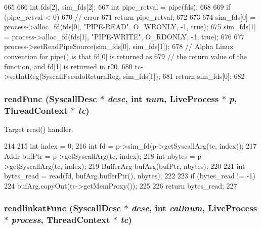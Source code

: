 \begin{DoxyCode}
665 {
666     int fds[2], sim_fds[2];
667     int pipe_retval = pipe(fds);
668 
669     if (pipe_retval < 0) {
670         // error
671         return pipe_retval;
672     }
673 
674     sim_fds[0] = process->alloc_fd(fds[0], "PIPE-READ", O_WRONLY, -1, true);
675     sim_fds[1] = process->alloc_fd(fds[1], "PIPE-WRITE", O_RDONLY, -1, true);
676 
677     process->setReadPipeSource(sim_fds[0], sim_fds[1]);
678     // Alpha Linux convention for pipe() is that fd[0] is returned as
679     // the return value of the function, and fd[1] is returned in r20.
680     tc->setIntReg(SyscallPseudoReturnReg, sim_fds[1]);
681     return sim_fds[0];
682 }
\end{DoxyCode}
\hypertarget{syscall__emul_8hh_a5cb187a0afcfb802a06396f382fe5ada}{
\subsubsection[{readFunc}]{ readFunc ({\bf SyscallDesc} $\ast$ {\em desc}, \/  int {\em num}, \/  {\bf LiveProcess} $\ast$ {\em p}, \/  {\bf ThreadContext} $\ast$ {\em tc})}}
\label{syscall__emul_8hh_a5cb187a0afcfb802a06396f382fe5ada}


Target read() handler. 


\begin{DoxyCode}
214 {
215     int index = 0;
216     int fd = p->sim_fd(p->getSyscallArg(tc, index));
217     Addr bufPtr = p->getSyscallArg(tc, index);
218     int nbytes = p->getSyscallArg(tc, index);
219     BufferArg bufArg(bufPtr, nbytes);
220 
221     int bytes_read = read(fd, bufArg.bufferPtr(), nbytes);
222 
223     if (bytes_read != -1)
224         bufArg.copyOut(tc->getMemProxy());
225 
226     return bytes_read;
227 }
\end{DoxyCode}
\hypertarget{syscall__emul_8hh_aa7c9ee715f608210172fa284884d6ae7}{
\subsubsection[{readlinkatFunc}]{ readlinkatFunc ({\bf SyscallDesc} $\ast$ {\em desc}, \/  int {\em callnum}, \/  {\bf LiveProcess} $\ast$ {\em process}, \/  {\bf ThreadContext} $\ast$ {\em tc})}}
\label{syscall__emul_8hh_aa7c9ee715f608210172fa284884d6ae7}


